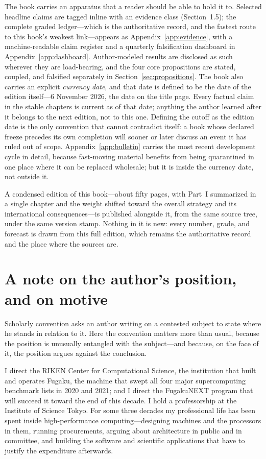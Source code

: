 \documentclass[11pt,a4paper,oneside]{book}
\newcommand{\datafreeze}{6 November 2026\xspace}
\begin{document}
The book carries an apparatus that a reader should be able to hold it to. Selected headline claims are tagged inline with an evidence class (Section~1.5); the complete graded ledger---which is the authoritative record, and the fastest route to this book's weakest link---appears as Appendix~\ref{app:evidence}, with a machine-readable claim register and a quarterly falsification dashboard in Appendix~\ref{app:dashboard}. Author-modeled results are disclosed as such wherever they are load-bearing, and the four core propositions are stated, coupled, and falsified separately in Section~\ref{sec:propositions}. The book also carries an explicit \emph{currency date}, and that date is defined to be the date of the edition itself---\datafreeze, the date on the title page. Every factual claim in the stable chapters is current as of that date; anything the author learned after it belongs to the next edition, not to this one. Defining the cutoff as the edition date is the only convention that cannot contradict itself: a book whose declared freeze precedes its own completion will sooner or later discuss an event it has ruled out of scope. Appendix~\ref{app:bulletin} carries the most recent development cycle in detail, because fast-moving material benefits from being quarantined in one place where it can be replaced wholesale; but it is inside the currency date, not outside it.

A condensed edition of this book---about fifty pages, with Part~I summarized in a single chapter and the weight shifted toward the overall strategy and its international consequences---is published alongside it, from the same source tree, under the same version stamp. Nothing in it is new: every number, grade, and forecast is drawn from this full edition, which remains the authoritative record and the place where the sources are.

\section*{A note on the author's position, and on motive}

Scholarly convention asks an author writing on a contested subject to state where he stands in relation to it. Here the convention matters more than usual, because the position is unusually entangled with the subject---and because, on the face of it, the position argues against the conclusion.

I direct the RIKEN Center for Computational Science, the institution that built and operates Fugaku, the machine that swept all four major supercomputing benchmark lists in 2020 and 2021; and I direct the FugakuNEXT program that will succeed it toward the end of this decade. I hold a professorship at the Institute of Science Tokyo. For some three decades my professional life has been spent inside high-performance computing---designing machines and the processors in them, running procurements, arguing about architecture in public and in committee, and building the software and scientific applications that have to justify the expenditure afterwards.
\end{document}
